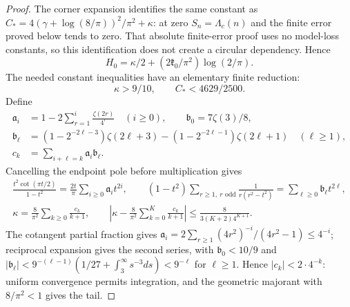 \begin{proof}
The corner expansion identifies the same constant as
$C_*=4(\gamma+\log(8/\pi))^2/\pi^2+\kappa$:
at zero $S_n=\Lambda_c(n)$ and the finite error proved below tends
to zero. That absolute finite-error proof uses no model-loss constants,
so this identification does not create a circular dependency. Hence
\begin{equation}\label{uc:origin-identity}
 H_0=\kappa/2+(2\mathfrak{k}_0/\pi^2)\log(2/\pi).
\end{equation}
The needed constant inequalities have an elementary finite reduction:
\begin{equation}\label{uc:coarse-input}
 \kappa>9/10,\qquad C_*<4629/2500.
\end{equation}
Define
\begin{align*}
 \mathfrak a_i&=1-2\sum_{r=1}^i\frac{\zeta(2r)}{4^r}\quad(i\geq0),
 \qquad\mathfrak b_0=7\zeta(3)/8,\\
 \mathfrak b_\ell&=(1-2^{-2\ell-3})\zeta(2\ell+3)
              -(1-2^{-2\ell-1})\zeta(2\ell+1)\quad(\ell\geq1),\\
 c_k&=\sum_{i+\ell=k}\mathfrak a_i\mathfrak b_\ell.
\end{align*}
Cancelling the endpoint pole before multiplication gives
\begin{equation}\label{uc:kappa-series}
 \begin{gathered}
 \frac{t^2\cot(\pi t/2)}{1-t^2}
       =\frac{2t}\pi\sum_{i\geq0}\mathfrak a_it^{2i},\qquad
 (1-t^2)\sum_{r\geq1,\ r\text{ odd}}
       \frac1{r(r^2-t^2)}=\sum_{\ell\geq0}\mathfrak b_\ell t^{2\ell},\\
 \kappa=\frac8{\pi^2}\sum_{k\geq0}\frac{c_k}{k+1},\qquad
 \left|\kappa-\frac8{\pi^2}\sum_{k=0}^K\frac{c_k}{k+1}\right|
       \leq\frac8{3(K+2)4^{K+1}}.
 \end{gathered}
\end{equation}
The cotangent partial fraction gives
$\mathfrak a_i=2\sum_{r\geq1}(4r^2)^{-i}/(4r^2-1)\leq4^{-i}$;
reciprocal expansion gives the second series, with $\mathfrak b_0<10/9$
and $|\mathfrak b_\ell|<9^{-(\ell-1)}(1/27+\int_3^\infty s^{-3}ds)<9^{-\ell}$
for $\ell\geq1$. Hence $|c_k|<2\cdot4^{-k}$: uniform convergence
permits integration, and the geometric majorant with $8/\pi^2<1$
gives the tail.


\end{proof}

